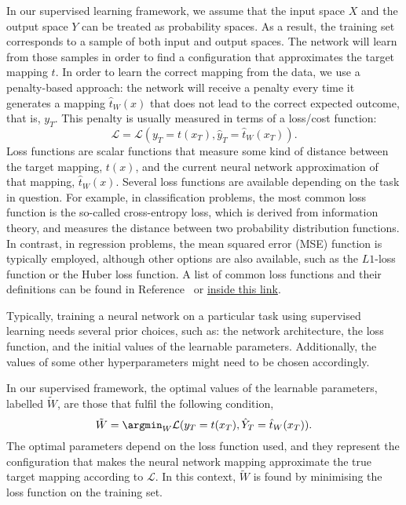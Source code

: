 In our supervised learning framework, we assume that the input space $X$ and the output space $Y$ can be
treated as probability spaces. As a result, the training set corresponds to a sample of both input and output
spaces. The network will learn from those samples in order to find a configuration that approximates the
target mapping $t$. In order to learn the correct mapping from the data, we use a penalty-based approach: the
network will receive a penalty every time it generates a mapping $\hat{t}_W(x)$ that does not lead to the
correct expected outcome, that is, $y_T$. This penalty is usually measured in terms of a loss/cost function:
\begin{equation} 
    \mathcal{L} = \mathcal{L}(y_T = t(x_T), \hat{y}_T = \hat{t}_W(x_T)).
\end{equation} 
Loss functions are scalar functions that measure some kind of distance between the target mapping, $t(x)$, and
the current neural network approximation of that mapping, $\hat{t}_W(x)$. Several loss functions are available
depending on the task in question. For example, in classification problems, the most common loss function is
the so-called cross-entropy loss, which is derived from information theory, and measures the distance between
two probability distribution functions. In contrast, in regression problems, the mean squared error (MSE)
function is typically employed, although other options are also available, such as the $L1$-loss function or
the Huber loss function. A list of common loss functions and their definitions can be found in
Reference~\cite{PyTorch} or \href{https://pytorch.org/docs/stable/nn.html}{inside this link}.

Typically, training a neural network on a particular task using supervised learning needs several prior
choices, such as: the network architecture, the loss function, and the initial values of the learnable
parameters. Additionally, the values of some other hyperparameters might need to be chosen accordingly. 

In our supervised framework, the optimal values of the learnable parameters, labelled $\tilde{W}$, are those
that fulfil the following condition,
\begin{equation}
    \tilde{W} = \argmin_{W} \mathcal{L}(y_T = t(x_T), \hat{Y}_T = \hat{t}_W(x_T)).
    \label{eq:neural_networks/argmin_eq}
\end{equation} 
The optimal parameters depend on the loss function used, and they represent the configuration that makes the
neural network mapping approximate the true target mapping according to $\mathcal{L}$. In this context,
$\tilde{W}$ is found by minimising the loss function on the training set.


